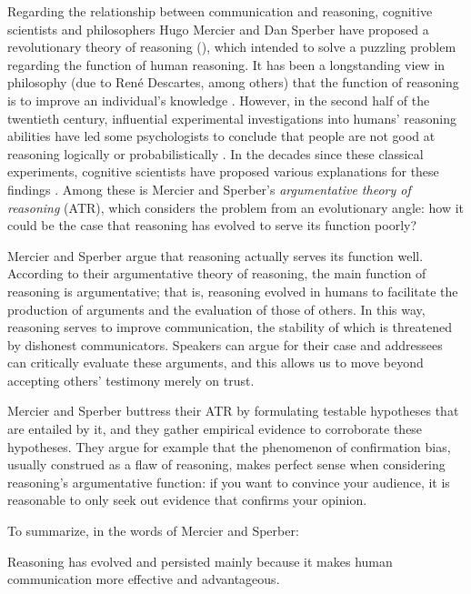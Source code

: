 
Regarding the relationship between communication and reasoning, cognitive scientists and philosophers Hugo Mercier and Dan Sperber have proposed a revolutionary theory of reasoning (\citeyear{MS11}), which intended to solve a puzzling problem regarding the function of human reasoning.
It has been a longstanding view in philosophy (due to René Descartes, among others) that the function of reasoning is to improve an individual's knowledge \citep{Schouls72, Walter51}.
However, in the second half of the twentieth century, influential experimental investigations into humans' reasoning abilities have led some psychologists to conclude that people are not good at reasoning logically \citep{Wason68} or probabilistically \citep{Tversky83}.
In the decades since these classical experiments, cognitive scientists have proposed various explanations for these findings \citep[e.g.][]{Cosmides89, Oaksford94, Hertwig99}.
Among these is Mercier and Sperber's \emph{argumentative theory of reasoning} (ATR), which considers the problem from an evolutionary angle: how it could be the case that reasoning has evolved to serve its function poorly?

Mercier and Sperber argue that reasoning actually serves its function well.
According to their argumentative theory of reasoning, the main function of reasoning is argumentative; that is, reasoning evolved in humans to facilitate the production of arguments and the evaluation of those of others. In this way, reasoning serves to improve communication, the stability of which is threatened by dishonest communicators. Speakers can argue for their case and addressees can critically evaluate these arguments, and this allows us to move beyond accepting others' testimony merely on trust.

Mercier and Sperber buttress their ATR by formulating testable hypotheses that are entailed by it, and they gather empirical evidence to corroborate these hypotheses. They argue for example that the phenomenon of confirmation bias, usually construed as a flaw of reasoning, makes perfect sense when considering reasoning's argumentative function: if you want to convince your audience, it is reasonable to only seek out evidence that confirms your opinion.

To summarize, in the words of Mercier and Sperber:
\begin{quoting}
    Reasoning has evolved and persisted mainly because it makes human communication more effective and advantageous.
\end{quoting}


